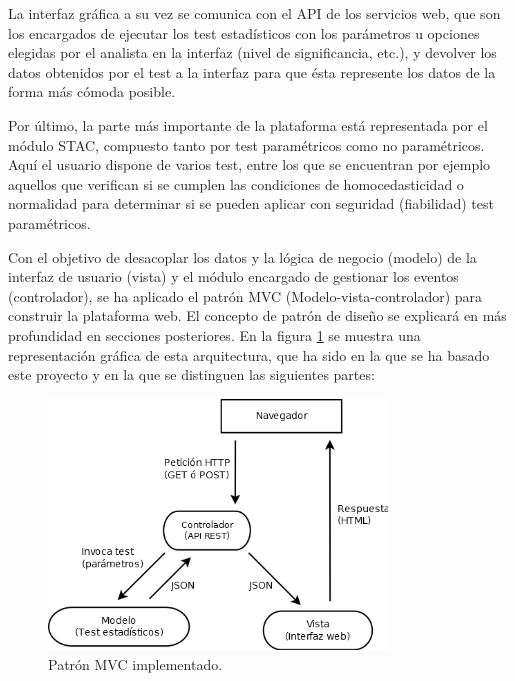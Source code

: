 La interfaz gráfica a su vez se comunica con el API de los servicios web, que son los encargados de ejecutar los test estadísticos con los parámetros u opciones elegidas por el analista en la interfaz (nivel de significancia, etc.), y devolver los datos obtenidos por el test a la interfaz para que ésta represente los datos de la forma más cómoda posible.

Por último, la parte más importante de la plataforma está representada por el módulo STAC, compuesto tanto por test paramétricos como no paramétricos. Aquí el usuario dispone de varios test, entre los que se encuentran por ejemplo aquellos que verifican si se cumplen las condiciones de homocedasticidad o normalidad para determinar si se pueden aplicar con seguridad (fiabilidad) test paramétricos.

Con el objetivo de desacoplar los datos y la lógica de negocio (modelo) de la interfaz de usuario (vista) y el módulo encargado de gestionar los eventos (controlador), se ha aplicado el patrón MVC (Modelo-vista-controlador) para construir la plataforma web. El concepto de patrón de diseño se explicará en más profundidad en secciones posteriores. En la figura \ref{fig:mvc} se muestra una representación gráfica de esta arquitectura, que ha sido en la que se ha basado este proyecto y en la que se distinguen las siguientes partes:

\begin{figure}[H]
\centering
\includegraphics[width=9cm]{figuras/mvc.png}
\caption{Patrón MVC implementado.}
\label{fig:mvc}
\end{figure}

